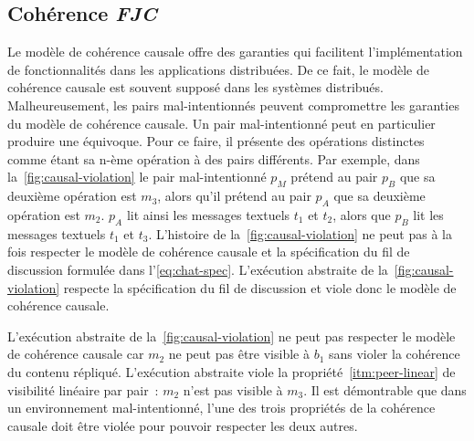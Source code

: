 \subsection{Cohérence \emph{\acl{FJC}}}


Le modèle de cohérence causale offre des garanties qui facilitent l'implémentation de fonctionnalités dans les applications distribuées.
De ce fait, le modèle de cohérence causale est souvent supposé dans les systèmes distribués.
Malheureusement, les pairs mal-intentionnés peuvent compromettre les garanties du modèle de cohérence causale.
Un pair mal-intentionné peut en particulier produire une équivoque.
Pour ce faire, il présente des opérations distinctes comme étant sa n-ème opération à des pairs différents.
Par exemple, dans la~\autoref{fig:causal-violation} le pair mal-intentionné $p_M$ prétend au pair $p_B$ que sa deuxième opération est $m_3$, alors qu'il prétend au pair $p_A$ que sa deuxième opération est $m_2$.
$p_A$ lit ainsi les messages textuels $t_1$ et $t_2$, alors que $p_B$ lit les messages textuels $t_1$ et $t_3$.
L'histoire de la~\autoref{fig:causal-violation} ne peut pas à la fois respecter le modèle de cohérence causale et la spécification du fil de discussion formulée dans l'\autoref{eq:chat-spec}.
L'exécution abstraite de la~\autoref{fig:causal-violation} respecte la spécification du fil de discussion et viole donc le modèle de cohérence causale.

L'exécution abstraite de la~\autoref{fig:causal-violation} ne peut pas respecter le modèle de cohérence causale car $m_2$ ne peut pas être visible à $b_1$ sans violer la cohérence du contenu répliqué.
L'exécution abstraite viole la propriété~\ref{itm:peer-linear} de visibilité linéaire par pair~: $m_2$ n'est pas visible à $m_3$.
Il est démontrable que dans un environnement mal-intentionné, l'une des trois propriétés de la cohérence causale doit être violée pour pouvoir respecter les deux autres.


